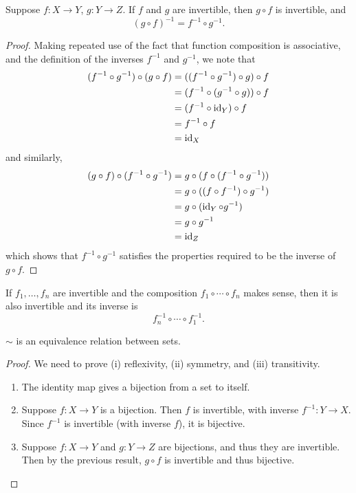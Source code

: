 \begin{proposition}
Suppose $f:X \to Y$, $g:Y \to Z$. If $f$ and $g$ are invertible, then $g \circ f$ is invertible, and
\[(g \circ f)^{-1}=f^{-1}\circ g^{-1}.\]
\end{proposition}

\begin{proof}
Making repeated use of the fact that function composition is associative, and the definition of the inverses $f^{-1}$ and $g^{-1}$, we note that
\begin{align*}
(f^{-1}\circ g^{-1}) \circ (g \circ f) 
&= ((f^{-1} \circ g^{-1}) \circ g) \circ f \\
&= (f^{-1} \circ (g^{-1} \circ g)) \circ f \\
&= (f^{-1} \circ \operatorname{id}_Y) \circ f \\
&= f^{-1} \circ f \\
&= \operatorname{id}_X
\end{align*}
and similarly,
\begin{align*}
(g \circ f) \circ (f^{-1} \circ g^{-1}) 
&= g \circ (f \circ (f^{-1} \circ g^{-1})) \\
&= g \circ ((f \circ f^{-1}) \circ g^{-1}) \\
&= g \circ (\operatorname{id}_Y \circ g^{-1}) \\
&= g \circ g^{-1} \\
&= \operatorname{id}_Z
\end{align*}
which shows that $f^{-1} \circ g^{-1}$ satisfies the properties required to be the inverse of $g \circ f$.
\end{proof}

\begin{corollary}
If $f_1,\dots,f_n$ are invertible and the composition $f_1\circ\cdots\circ f_n$ makes sense, then it is also invertible and its inverse is
\[f_n^{-1}\circ\cdots\circ f_1^{-1}.\]
\end{corollary}

\begin{proposition}
$\sim$ is an equivalence relation between sets.
\end{proposition}

\begin{proof}
We need to prove (i) reflexivity, (ii) symmetry, and (iii) transitivity.
\begin{enumerate}[label=(\roman*)]
\item The identity map gives a bijection from a set to itself.
\item Suppose $f:X\to Y$ is a bijection. Then $f$ is invertible, with inverse $f^{-1}:Y\to X$. Since $f^{-1}$ is invertible (with inverse $f$), it is bijective.
\item Suppose $f:X\to Y$ and $g:Y\to Z$ are bijections, and thus they are invertible. Then by the previous result, $g\circ f$ is invertible and thus bijective.
\end{enumerate}
\end{proof}

